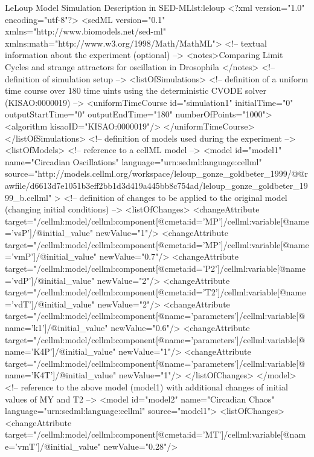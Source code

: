 \footnotesize
\begin{myXmlLst}{LeLoup Model Simulation Description in SED-ML}{lst:leloup}
<?xml version="1.0" encoding="utf-8"?>
<sedML version="0.1" xmlns="http://www.biomodels.net/sed-ml" xmlns:math="http://www.w3.org/1998/Math/MathML">
 <!-- textual information about the experiment (optional) -->
 <notes>Comparing Limit Cycles and strange attractors for oscillation in Drosophila
 </notes> 
 <!-- definition of simulation setup -->
 <listOfSimulations>
  <!-- definition of a uniform time course over 180 time uints using the deterministic CVODE solver (KISAO:0000019) -->
  <uniformTimeCourse id="simulation1" initialTime="0" outputStartTime="0" outputEndTime="180" numberOfPoints="1000">
  <algorithm kisaoID="KISAO:0000019"/>
  </uniformTimeCourse>
 </listOfSimulations>
 <!-- definition of models used during the experiment -->
 <listOfModels>
  <!-- reference to a cellML model -->
  <model id="model1" name="Circadian Oscillations" language="urn:sedml:language:cellml" 
   source="http://models.cellml.org/workspace/leloup_gonze_goldbeter_1999/@@rawfile/d6613d7e1051b3eff2bb1d3d419a445bb8c754ad/leloup_gonze_goldbeter_1999_b.cellml" >
   <!-- definition of changes to be applied to the original model (changing initial conditions) -->
   <listOfChanges>
    <changeAttribute target="/cellml:model/cellml:component[@cmeta:id='MP']/cellml:variable[@name='vsP']/@initial_value" newValue="1"/>
    <changeAttribute target="/cellml:model/cellml:component[@cmeta:id='MP']/cellml:variable[@name='vmP']/@initial_value" newValue="0.7"/>
    <changeAttribute target="/cellml:model/cellml:component[@cmeta:id='P2']/cellml:variable[@name='vdP']/@initial_value" newValue="2"/>
    <changeAttribute target="/cellml:model/cellml:component[@cmeta:id='T2']/cellml:variable[@name='vdT']/@initial_value" newValue="2"/>  
    <changeAttribute target="/cellml:model/cellml:component[@name='parameters']/cellml:variable[@name='k1']/@initial_value" newValue="0.6"/>
    <changeAttribute target="/cellml:model/cellml:component[@name='parameters']/cellml:variable[@name='K4P']/@initial_value" newValue="1"/>
    <changeAttribute target="/cellml:model/cellml:component[@name='parameters']/cellml:variable[@name='K4T']/@initial_value" newValue="1"/>
   </listOfChanges>
  </model>
  <!-- reference to the above model (model1) with additional changes of initial values of MY and T2 -->
  <model id="model2" name="Circadian Chaos" language="urn:sedml:language:cellml" source="model1">
   <listOfChanges>
    <changeAttribute target="/cellml:model/cellml:component[@cmeta:id='MT']/cellml:variable[@name='vmT']/@initial_value" newValue="0.28"/>

\end{myXmlLst}
